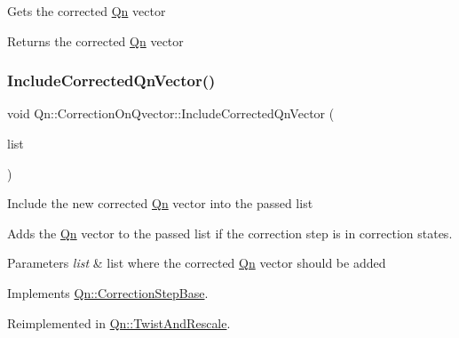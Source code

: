 Gets the corrected \mbox{\hyperlink{namespaceQn}{Qn}} vector \begin{DoxyReturn}{Returns}
the corrected \mbox{\hyperlink{namespaceQn}{Qn}} vector 
\end{DoxyReturn}
\mbox{\label{classQn_1_1CorrectionOnQvector_a42d85f899f00a6e816969d5784c50765}} 
\subsubsection{\texorpdfstring{Include\+Corrected\+Qn\+Vector()}{IncludeCorrectedQnVector()}}
{\footnotesize\ttfamily void Qn\+::\+Correction\+On\+Qvector\+::\+Include\+Corrected\+Qn\+Vector (\begin{DoxyParamCaption}\item[{T\+List $\ast$}]{list }\end{DoxyParamCaption})\hspace{0.3cm}{\ttfamily [virtual]}}

Include the new corrected \mbox{\hyperlink{namespaceQn}{Qn}} vector into the passed list

Adds the \mbox{\hyperlink{namespaceQn}{Qn}} vector to the passed list if the correction step is in correction states. 
\begin{DoxyParams}{Parameters}
{\em list} & list where the corrected \mbox{\hyperlink{namespaceQn}{Qn}} vector should be added \\
\hline
\end{DoxyParams}


Implements \mbox{\hyperlink{classQn_1_1CorrectionStepBase_a5f8936b56bfe4e5a7bf1e79775241500}{Qn\+::\+Correction\+Step\+Base}}.



Reimplemented in \mbox{\hyperlink{classQn_1_1TwistAndRescale_aad00583024f1a71458d6c86ba1cc4d44}{Qn\+::\+Twist\+And\+Rescale}}.

\mbox{\label{classQn_1_1CorrectionOnQvector_a4d47a1c241b4bfd5ac98d6fdbc90eb79}} 
